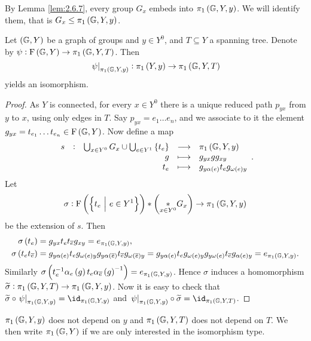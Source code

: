\pagebreak


\begin{corollary}
By Lemma \ref{lem:2.6.7}, every group $ G_x $ embeds into $ \pi_1\br{\GG, Y, y} $. We will identify them, that is $ G_x \le \pi_1\br{\GG, Y, y} $.
\end{corollary}

\begin{lemma}
Let $ \br{\GG, Y} $ be a graph of groups and $ y \in Y^0 $, and $ T \subseteq Y $ a spanning tree. Denote by $ \psi : \F\br{\GG, Y} \to \pi_1\br{\GG, Y, T} $. Then
$$ \eval{\psi}_{\pi_1\br{\GG, Y, y}} : \pi_1\br{Y, y} \to \pi_1\br{\GG, Y, T} $$
yields an isomorphism.
\end{lemma}

\begin{proof}
As $ Y $ is connected, for every $ x \in Y^0 $ there is a unique reduced path $ p_{yx} $ from $ y $ to $ x $, using only edges in $ T $. Say $ p_{yx} = e_1 \dots e_n $, and we associate to it the element $ g_{yx} = t_{e_1} \dots t_{e_n} \in \F\br{\GG, Y} $. Now define a map
$$ \functions[s]{\bigcup_{x \in Y^0} G_x \cup \bigcup_{e \in Y^1} \cbr{t_e}}{\pi_1\br{\GG, Y, y}}{g}{g_{yx}gg_{xy}}{t_e}{g_{y\alpha\br{e}}t_eg_{\omega\br{e}y}}. $$
Let
$$ \sigma : \F\br{\cbr{t_e \st e \in Y^1}} * \br{\underset{x \in Y^0}{*} G_x} \to \pi_1\br{\GG, Y, y} $$
be the extension of $ s $. Then
\begin{align*}
\sigma\br{t_e} & = g_{yx}t_et_{\overline{e}}g_{xy} = e_{\pi_1\br{\GG, Y, y}}, \\
\sigma\br{t_et_{\overline{e}}} & = g_{y\alpha\br{e}}t_eg_{\omega\br{e}y}g_{y\alpha\br{\overline{e}}}t_{\overline{e}}g_{\omega\br{\overline{e}}y} = g_{y\alpha\br{e}}t_eg_{\omega\br{e}y}g_{y\omega\br{e}}t_{\overline{e}}g_{\alpha\br{e}y} = e_{\pi_1\br{\GG, Y, y}}.
\end{align*}
Similarly $ \sigma\br{t_e^{-1}\alpha_e\br{g}t_e\alpha_{\overline{e}}\br{g}^{-1}} = e_{\pi_1\br{\GG, Y, y}} $. Hence $ \sigma $ induces a homomorphism $ \widetilde{\sigma} : \pi_1\br{\GG, Y, T} \to \pi_1\br{\GG, Y, y} $. Now it is easy to check that $ \widetilde{\sigma} \circ \eval{\psi}_{\pi_1\br{\GG, Y, y}} = \id_{\pi_1\br{\GG, Y, y}} $ and $ \eval{\psi}_{\pi_1\br{\GG, Y, y}} \circ \widetilde{\sigma} = \id_{\pi_1\br{\GG, Y, T}} $.
\end{proof}

\begin{corollary}
$ \pi_1\br{\GG, Y, y} $ does not depend on $ y $ and $ \pi_1\br{\GG, Y, T} $ does not depend on $ T $. We then write $ \pi_1\br{\GG, Y} $ if we are only interested in the isomorphism type.
\end{corollary}


